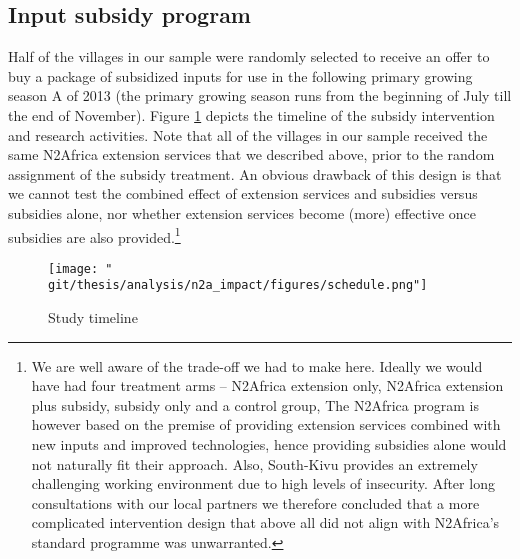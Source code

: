 \subsection{Input subsidy program} 
Half of the villages in our sample were randomly selected to receive an offer to buy a package of subsidized inputs for use in the following primary growing season A of 2013 (the primary growing season runs from the beginning of July till the end of November). Figure \ref{fig:n2a:timeline} depicts the timeline of the subsidy intervention and research activities. Note that all of the villages in our sample received the same N2Africa extension services that we described above, prior to the random assignment of the subsidy treatment. An obvious drawback of this design is that we cannot test the combined effect of extension services and subsidies versus subsidies alone, nor whether extension services become (more) effective once subsidies are also provided.\footnote{We are well aware of the trade-off we had to make here. Ideally we would have had four treatment arms – N2Africa extension only, N2Africa extension plus subsidy, subsidy only and a control group, The N2Africa program is however based on the premise of providing extension services combined with new inputs and improved technologies, hence providing subsidies alone would not naturally fit their approach. Also, South-Kivu provides an extremely challenging working environment due to high levels of insecurity. After long consultations with our local partners we therefore concluded that a more complicated intervention design that above all did not align with N2Africa’s standard programme was unwarranted.}

\begin{figure}[htb]
  \texttt{[image: "\\git/thesis/analysis/n2a\_impact/figures/schedule.png"]}
  \caption{Study timeline}
  \label{fig:n2a:timeline}
\end{figure}


